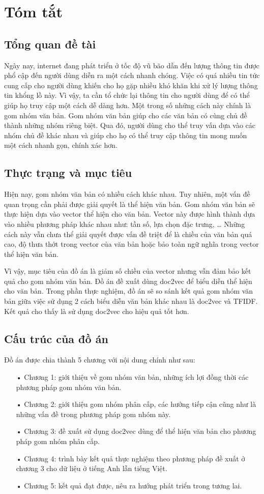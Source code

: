 \chapter*{Tóm tắt}
\label{tomtat}

\section*{Tổng quan đề tài}
Ngày nay, internet đang phát triển ở tốc độ vũ bão dẫn đến lượng thông tin được phổ cập đến người dùng diễn ra một cách nhanh chóng.
Việc có quá nhiều tin tức cung cấp cho người dùng khiến cho họ gặp nhiều khó khăn khi xử lý lượng thông tin khổng lồ này.
Vì vậy, ta cần tổ chức lại thông tin cho người dùng để có thể giúp họ truy cập một cách dễ dàng hơn.
Một trong số những cách này chính là gom nhóm văn bản.
Gom nhóm văn bản giúp cho các văn bản có cùng chủ đề thành những nhóm riêng biệt.
Qua đó, người dùng cho thể truy vấn dựa vào các nhóm chủ đề khác nhau và giúp cho họ có thể truy cập thông tin mong muốn một cách nhanh gọn, chính xác hơn.

\section*{Thực trạng và mục tiêu}
Hiện nay, gom nhóm văn bản có nhiều cách khác nhau.
Tuy nhiên, một vấn đề quan trọng cần phải được giải quyết là thể hiện văn bản.
Gom nhóm văn bản sẽ thực hiện dựa vào vector thể hiện cho văn bản.
Vector này được hình thành dựa vào nhiều phương pháp khác nhau như: tần số, lựa chọn đặc trưng, \ldots
Những cách này vẫn chưa thể giải quyết được vấn đề triệt để là chiều của văn bản quá cao, độ thưa thớt trong vector của văn bản hoặc bảo toàn ngữ nghĩa trong vector thể hiện văn bản.

Vì vậy, mục tiêu của đồ án là giảm số chiều của vector nhưng vẫn đảm bảo kết quả cho gom nhóm văn bản.
Đồ án đề xuất dùng doc2vec để biểu diễn thể hiện cho văn bản.
Trong phần thực nghiệm, đồ án sẽ so sánh kết quả gom nhóm văn bản giữa việc sử dụng 2 cách biểu diễn văn bản khác nhau là doc2vec và TFIDF.
Kết quả cho thấy là sử dụng doc2vec cho hiệu quả tốt hơn.

\section*{Cấu trúc của đồ án}
Đồ án được chia thành 5 chương với nội dung chính như sau:
\begin{enumerate}
\item[•]Chương 1: giới thiệu về gom nhóm văn bản, những ích lợi đồng thời các phương pháp gom nhóm văn bản.
\item[•]Chương 2: giới thiệu gom nhóm phân cấp, các hướng tiếp cận cũng như là những vấn đề trong phương pháp gom nhóm này.
\item[•]Chương 3: đề xuất sử dụng doc2vec dùng để thể hiện văn bản cho phương pháp gom nhóm phân cấp.
\item[•]Chương 4: trình bày kết quả thực nghiệm theo phương pháp đề xuất ở chương 3 cho dữ liệu ở tiếng Anh lẫn tiếng Việt.
\item[•]Chương 5: kết quả đạt được, nêu ra hướng phát triển trong tương lai.
\end{enumerate}